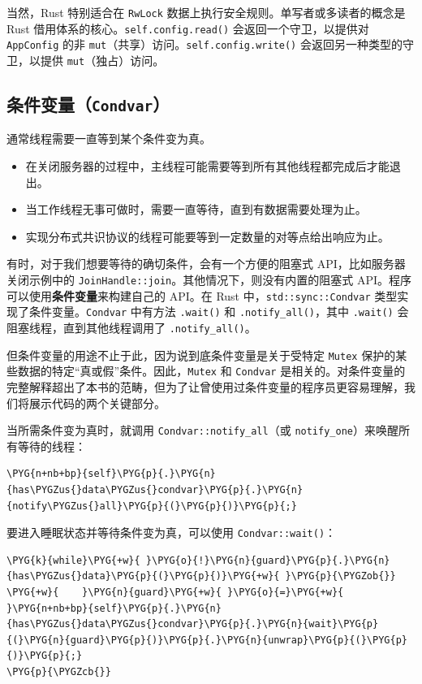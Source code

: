 当然，Rust 特别适合在 \texttt{RwLock} 数据上执行安全规则。单写者或多读者的概念是 Rust 借用体系的核心。\texttt{self.config.read()} 会返回一个守卫，以提供对 \texttt{AppConfig} 的非 \texttt{mut}（共享）访问。\texttt{self.config.write()} 会返回另一种类型的守卫，以提供 \texttt{mut}（独占）访问。

\subsection{条件变量（\texttt{Condvar}）}

通常线程需要一直等到某个条件变为真。

\begin{itemize}
\item 在关闭服务器的过程中，主线程可能需要等到所有其他线程都完成后才能退出。
\item 当工作线程无事可做时，需要一直等待，直到有数据需要处理为止。
\item 实现分布式共识协议的线程可能要等到一定数量的对等点给出响应为止。
\end{itemize}

有时，对于我们想要等待的确切条件，会有一个方便的阻塞式 API，比如服务器关闭示例中的 \texttt{JoinHandle::join}。其他情况下，则没有内置的阻塞式 API。程序可以使用\textbf{条件变量}来构建自己的 API。在 Rust 中，\texttt{std::sync::Condvar} 类型实现了条件变量。\texttt{Condvar} 中有方法 \texttt{.wait()} 和 \texttt{.notify\_all()}，其中 \texttt{.wait()} 会阻塞线程，直到其他线程调用了 \texttt{.notify\_all()}。

但条件变量的用途不止于此，因为说到底条件变量是关于受特定 \texttt{Mutex} 保护的某些数据的特定“真或假”条件。因此，\texttt{Mutex} 和 \texttt{Condvar} 是相关的。对条件变量的完整解释超出了本书的范畴，但为了让曾使用过条件变量的程序员更容易理解，我们将展示代码的两个关键部分。

当所需条件变为真时，就调用 \texttt{Condvar::notify\_all}（或 \texttt{notify\_one}）来唤醒所有等待的线程：

\begin{Verbatim}[commandchars=\\\{\},breaklines=true,breakanywhere=true,fontsize=\codefont,xleftmargin=17bp]
\PYG{n+nb+bp}{self}\PYG{p}{.}\PYG{n}{has\PYGZus{}data\PYGZus{}condvar}\PYG{p}{.}\PYG{n}{notify\PYGZus{}all}\PYG{p}{(}\PYG{p}{)}\PYG{p}{;}
\end{Verbatim}

要进入睡眠状态并等待条件变为真，可以使用 \texttt{Condvar::wait()}：

\begin{Verbatim}[commandchars=\\\{\},breaklines=true,breakanywhere=true,fontsize=\codefont,xleftmargin=17bp]
\PYG{k}{while}\PYG{+w}{ }\PYG{o}{!}\PYG{n}{guard}\PYG{p}{.}\PYG{n}{has\PYGZus{}data}\PYG{p}{(}\PYG{p}{)}\PYG{+w}{ }\PYG{p}{\PYGZob{}}
\PYG{+w}{    }\PYG{n}{guard}\PYG{+w}{ }\PYG{o}{=}\PYG{+w}{ }\PYG{n+nb+bp}{self}\PYG{p}{.}\PYG{n}{has\PYGZus{}data\PYGZus{}condvar}\PYG{p}{.}\PYG{n}{wait}\PYG{p}{(}\PYG{n}{guard}\PYG{p}{)}\PYG{p}{.}\PYG{n}{unwrap}\PYG{p}{(}\PYG{p}{)}\PYG{p}{;}
\PYG{p}{\PYGZcb{}}
\end{Verbatim}

